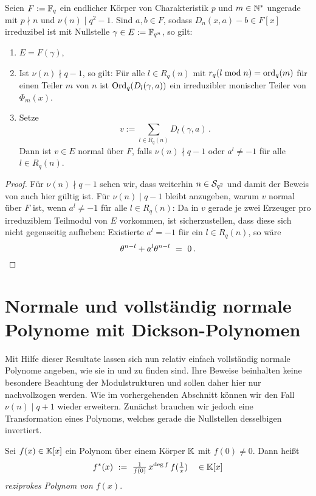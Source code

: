 \begin{satz}
  \label{satz:scheerhorn_erweitert}
  Seien $F := \F_q$ ein endlicher Körper von Charakteristik $p$ und $m\in
  \N^\ast$ ungerade mit $p\nmid n$ und $\nu(n)\mid q^2-1$. Sind $a,b\in F$, 
  sodass $D_n(x,a)-b \in F[x]$ irreduzibel ist mit Nullstelle $\gamma \in E:=
  \F_{q^n}$, so gilt:
  \begin{enumerate}
    \item $E = F(\gamma)$,
    \item Ist $\nu(n)\nmid q-1$, so gilt:
      Für alle $l\in R_q(n)$ mit $r_q(l\bmod n) = \ord_q(m)$ 
      für einen Teiler $m$ von $n$ ist 
      $\Ord_q(D_l(\gamma,a))$ ein irreduzibler monischer Teiler von
      $\Phi_m(x)$.
    \item Setze 
      \[ v := \sum_{l\in R_q(n)} D_l(\gamma,a)\,. \]
      Dann ist $v \in E$ normal über $F$, falls
      $\nu(n)\nmid q-1$ oder $a^l\neq -1$ für alle $l \in R_q(n)$.
  \end{enumerate}
\end{satz}
\begin{proof}
  Für $\nu(n)\nmid q-1$ 
  sehen wir, dass weiterhin $n\in \S_{q^2}$ und damit der Beweis 
  von  auch hier gültig ist.
  Für $\nu(n)\mid q-1$ bleibt anzugeben, warum $v$ normal über $F$ ist, wenn
  $a^l\neq -1$ für alle $l\in R_q(n)$:
  Da in $v$ gerade je zwei Erzeuger pro irreduziblem Teilmodul von $E$
  vorkommen, ist sicherzustellen, dass diese sich nicht gegenseitig aufheben:
  Existierte $a^l = -1$ für ein $l\in R_q(n)$, so wäre
  \[ \theta^{n-l} + a^l\theta^{n-l} \speq= 0\,.\]
\end{proof}


\section{Normale und vollständig normale Polynome mit
  Dickson-Poly\-nomen}

Mit Hilfe dieser Resultate lassen sich nun relativ einfach vollständig normale
Polynome angeben, wie sie in \autocite[Section 3]{scheerhorn:1997} und 
\autocite[Section 4]{scheerhorn:1996} zu finden sind. Ihre Beweise beinhalten
keine besondere Beachtung der Modulstrukturen und sollen daher hier nur
nachvollzogen werden. Wie im vorhergehenden Abschnitt können wir den Fall
$\nu(n)\mid q+1$ wieder erweitern.
Zunächst brauchen wir jedoch eine Transformation eines Polynoms, welches gerade
die Nullstellen desselbigen invertiert.

\begin{definition}
  Sei $f(x) \in \K[x]$ ein Polynom über einem Körper $\K$ mit 
  $f(0)\neq 0$. Dann heißt
  \[ f^\ast(x) \speq{:=} \tfrac{1}{f(0)}\, x^{\deg f}\, f(\tfrac 1 x)
    \quad \in \K[x] \]
  \emph{reziprokes Polynom von $f(x)$}.
\end{definition}

